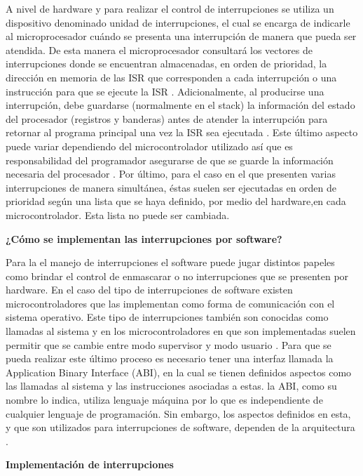 \documentclass[a4paper,11pt]{article}
\begin{document}
A nivel de hardware y para realizar el control de interrupciones se utiliza un dispositivo denominado unidad de interrupciones, el cual se encarga de indicarle al microprocesador cuándo se presenta una interrupción de manera que pueda ser atendida.
De esta manera el microprocesador consultará los vectores de interrupciones donde se encuentran almacenadas, en orden de prioridad, la dirección en memoria de las ISR que corresponden a cada interrupción o una instrucción para que se ejecute la ISR \cite[p.9]{susnea2005microcontrollers}. Adicionalmente, al producirse una interrupción, debe guardarse (normalmente en el stack) la información del estado del procesador (registros y banderas) antes de atender la interrupción para retornar al programa principal una vez la ISR sea ejecutada \cite[p.4]{reyes2015arduino}. Este último aspecto puede variar dependiendo del microcontrolador utilizado así que es responsabilidad del programador asegurarse de que se guarde la información necesaria del procesador \cite[p.10]{susnea2005microcontrollers}.
Por último, para el caso en el que presenten varias interrupciones de manera simultánea, éstas suelen ser ejecutadas en orden de prioridad según una lista que se haya definido, por medio del hardware,en cada microcontrolador. Esta lista no puede ser cambiada.

{\large\bfseries ¿Cómo se implementan las interrupciones por software?  } 

Para la el manejo de interrupciones el software puede jugar distintos papeles como brindar el control de  enmascarar o no interrupciones que se presenten por hardware.
En el caso del tipo de interrupciones de software existen microcontroladores que las implementan como forma de comunicación con el sistema operativo. Este tipo de interrupciones también son conocidas como llamadas al sistema y en los microcontroladores en que son implementadas suelen permitir que se cambie entre modo supervisor y modo usuario \cite[p.236]{rafiquzzaman1995microprocessors}.
Para que se pueda realizar este último proceso es necesario tener una interfaz llamada la Application Binary Interface (ABI), en la cual se tienen definidos aspectos como las llamadas al sistema y las instrucciones asociadas a estas. la ABI, como su nombre lo indica, utiliza lenguaje máquina por lo que es independiente de cualquier lenguaje de programación. Sin embargo, los aspectos definidos en esta, y que son utilizados para interrupciones de software, dependen de la arquitectura \cite[p.24]{ecker2009hardware}.

{\large\bfseries Implementación de interrupciones} 
\end{document}
